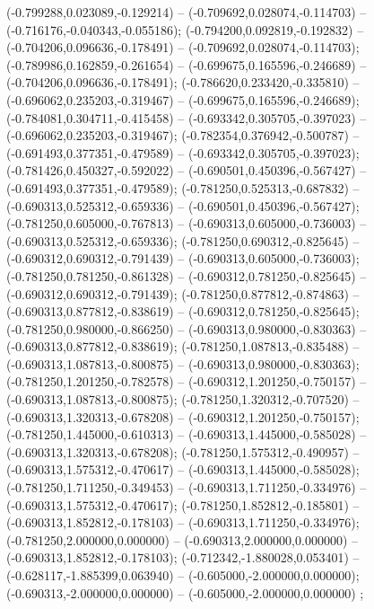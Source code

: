  (-0.799288,0.023089,-0.129214) -- (-0.709692,0.028074,-0.114703) -- (-0.716176,-0.040343,-0.055186);
 (-0.794200,0.092819,-0.192832) -- (-0.704206,0.096636,-0.178491) -- (-0.709692,0.028074,-0.114703);
 (-0.789986,0.162859,-0.261654) -- (-0.699675,0.165596,-0.246689) -- (-0.704206,0.096636,-0.178491);
 (-0.786620,0.233420,-0.335810) -- (-0.696062,0.235203,-0.319467) -- (-0.699675,0.165596,-0.246689);
 (-0.784081,0.304711,-0.415458) -- (-0.693342,0.305705,-0.397023) -- (-0.696062,0.235203,-0.319467);
 (-0.782354,0.376942,-0.500787) -- (-0.691493,0.377351,-0.479589) -- (-0.693342,0.305705,-0.397023);
 (-0.781426,0.450327,-0.592022) -- (-0.690501,0.450396,-0.567427) -- (-0.691493,0.377351,-0.479589);
 (-0.781250,0.525313,-0.687832) -- (-0.690313,0.525312,-0.659336) -- (-0.690501,0.450396,-0.567427);
 (-0.781250,0.605000,-0.767813) -- (-0.690313,0.605000,-0.736003) -- (-0.690313,0.525312,-0.659336);
 (-0.781250,0.690312,-0.825645) -- (-0.690312,0.690312,-0.791439) -- (-0.690313,0.605000,-0.736003);
 (-0.781250,0.781250,-0.861328) -- (-0.690312,0.781250,-0.825645) -- (-0.690312,0.690312,-0.791439);
 (-0.781250,0.877812,-0.874863) -- (-0.690313,0.877812,-0.838619) -- (-0.690312,0.781250,-0.825645);
 (-0.781250,0.980000,-0.866250) -- (-0.690313,0.980000,-0.830363) -- (-0.690313,0.877812,-0.838619);
 (-0.781250,1.087813,-0.835488) -- (-0.690313,1.087813,-0.800875) -- (-0.690313,0.980000,-0.830363);
 (-0.781250,1.201250,-0.782578) -- (-0.690312,1.201250,-0.750157) -- (-0.690313,1.087813,-0.800875);
 (-0.781250,1.320312,-0.707520) -- (-0.690313,1.320313,-0.678208) -- (-0.690312,1.201250,-0.750157);
 (-0.781250,1.445000,-0.610313) -- (-0.690313,1.445000,-0.585028) -- (-0.690313,1.320313,-0.678208);
 (-0.781250,1.575312,-0.490957) -- (-0.690313,1.575312,-0.470617) -- (-0.690313,1.445000,-0.585028);
 (-0.781250,1.711250,-0.349453) -- (-0.690313,1.711250,-0.334976) -- (-0.690313,1.575312,-0.470617);
 (-0.781250,1.852812,-0.185801) -- (-0.690313,1.852812,-0.178103) -- (-0.690313,1.711250,-0.334976);
 (-0.781250,2.000000,0.000000) -- (-0.690313,2.000000,0.000000) -- (-0.690313,1.852812,-0.178103);
 (-0.712342,-1.880028,0.053401) -- (-0.628117,-1.885399,0.063940) -- (-0.605000,-2.000000,0.000000);
 (-0.690313,-2.000000,0.000000) -- (-0.605000,-2.000000,0.000000) ;
